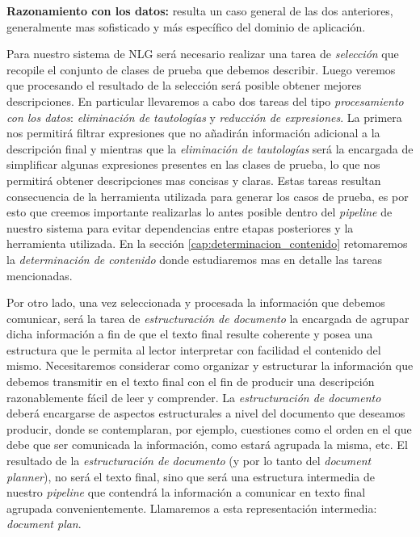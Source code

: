 \bigskip
\noindent
\textbf{Razonamiento con los datos:} resulta un caso general de las dos anteriores, generalmente mas sofisticado y más específico del dominio de aplicación. 

\bigskip
Para nuestro sistema de NLG será necesario realizar una tarea de \emph{selección} que recopile el conjunto de clases de prueba que debemos describir. Luego veremos que procesando el resultado de la selección será posible obtener mejores descripciones. En particular llevaremos a cabo dos tareas del tipo \emph{procesamiento con los datos}: \emph{eliminación de tautologías} y \emph{reducción de expresiones}. La primera nos permitirá filtrar expresiones que no añadirán información adicional a la descripción final y mientras que la \emph{eliminación de tautologías} será la encargada de simplificar algunas expresiones presentes en las clases de prueba, lo que nos permitirá obtener descripciones mas concisas y claras. Estas tareas resultan consecuencia de la herramienta utilizada para generar los casos de prueba, es por esto que creemos importante realizarlas lo antes posible dentro del \textit{pipeline} de nuestro sistema para evitar dependencias entre etapas posteriores y la herramienta utilizada. En la sección \ref{cap:determinacion_contenido} retomaremos la \emph{determinación de contenido} donde estudiaremos mas en detalle las tareas mencionadas.

Por otro lado, una vez seleccionada y procesada la información que debemos comunicar, será la tarea de \emph{estructuración de documento} la encargada de agrupar dicha información a fin de que el texto final resulte coherente y posea una estructura que le permita al lector interpretar con facilidad el contenido del mismo. Necesitaremos considerar como organizar y estructurar la información que debemos transmitir en el texto final con el fin de producir una descripción razonablemente fácil de leer y comprender. La \emph{estructuración de documento} deberá encargarse de aspectos estructurales a nivel del documento que deseamos producir, donde se contemplaran, por ejemplo, cuestiones como el orden en el que debe que ser comunicada la información, como estará agrupada la misma, etc. El resultado de la \emph{estructuración de documento} (y por lo tanto del \textit{document planner}), no será el texto final, sino que será una estructura intermedia de nuestro \textit{pipeline} que contendrá la información a comunicar en texto final agrupada convenientemente. Llamaremos a esta representación intermedia: \emph{document plan}. 

